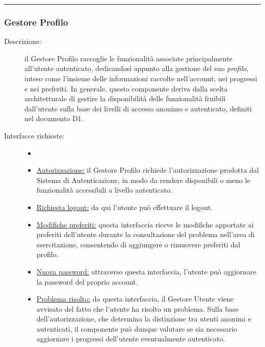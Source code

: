 \documentclass[11pt, a4paper]{article}
\theoremstyle{definition} %
\begin{document}
\begin{center}
    \rule{5cm}{1pt}
\end{center}

\subsubsection{Gestore Profilo}
\begin{description}
    \item[Descrizione:] il Gestore Profilo raccoglie le funzionalità
    associate principalmente all'utente autenticato, dedicandosi appunto alla
    gestione del suo \textit{profilo}, inteso come l'insieme delle informazioni
    raccolte nell'account, nei progressi e nei preferiti. In generale, questo
    componente deriva dalla scelta architetturale di gestire la disponibilità
    delle funzionalità fruibili dall'utente sulla base dei livelli di accesso
    anonimo e autenticato, definiti nel documento D1.

    \item[Interfacce richieste:]
    \begin{itemize}
        \item[]

        \item \underline{Autorizzazione:} il Gestore Profilo richiede l'autorizzazione
        prodotta dal Sistema di Autenticazione, in modo da rendere disponibili o
        meno le funzionalità accessibili a livello autenticato.

        \item \underline{Richiesta logout:} da qui l'utente può effettuare il logout.

        \item \underline{Modifiche preferiti:} questa interfaccia riceve le
        modifiche apportate ai preferiti dell'utente durante la consultazione
        del problema nell'area di esercitazione, consentendo di aggiungere o
        rimuovere preferiti dal profilo.

        \item \underline{Nuova password:} attraverso questa interfaccia,
        l'utente può aggiornare la password del proprio account.

        \item \underline{Problema risolto:} da questa interfaccia, il Gestore
        Utente viene avvisato del fatto che l'utente ha risolto un problema.
        Sulla base dell'autorizzazione, che determina la distinzione tra
        utenti anonimi e autenticati, il componente può dunque valutare se
        sia necessario aggiornare i progressi dell'utente eventualmente autenticato.
    \end{itemize}


\end{description}
\end{document}
